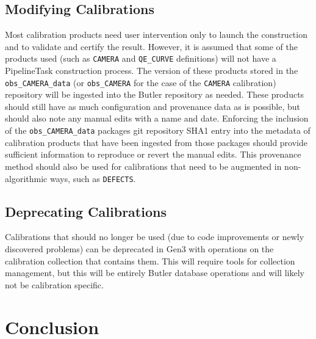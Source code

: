 \documentclass[DM,authoryear,toc]{lsstdoc}
\begin{document}
\subsection{Modifying Calibrations}

Most calibration products need user intervention only to launch the
construction and to validate and certify the result.  However, it is
assumed that some of the products used (such as \verb|CAMERA| and
\verb|QE_CURVE| definitions) will not have a PipelineTask construction
process.  The version of these products stored in the
\verb|obs_CAMERA_data| (or \verb|obs_CAMERA| for the case of the
\verb|CAMERA| calibration) repository will be ingested into the Butler
repository as needed.  These products should still have as much
configuration and provenance data as is possible, but should also note
any manual edits with a name and date.  Enforcing the inclusion of the
\verb|obs_CAMERA_data| packages git repository SHA1 entry into the
metadata of calibration products that have been ingested from those
packages should provide sufficient information to reproduce or revert
the manual edits.  This provenance method should also be used for
calibrations that need to be augmented in non-algorithmic ways, such
as \verb|DEFECTS|.

\subsection{Deprecating Calibrations}

Calibrations that should no longer be used (due to code improvements
or newly discovered problems) can be deprecated in Gen3 with
operations on the calibration collection that contains them.  This
will require tools for collection management, but this will be
entirely Butler database operations and will likely not be calibration
specific.


\section{Conclusion}



\appendix
\end{document}
